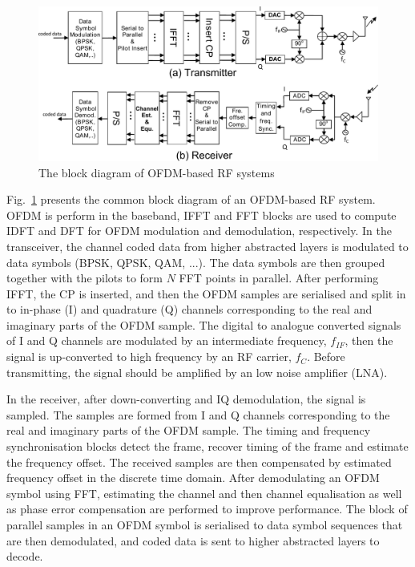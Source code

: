 \begin{figure}
	\centerline{\includegraphics [width=0.8\columnwidth] {Figures/OFDM-block.pdf} }
	\caption{The block diagram of OFDM-based RF systems}
	\label{fig:OFDM-block}
\end{figure}

Fig.~\ref{fig:OFDM-block} presents the common block diagram of an OFDM-based RF system.
OFDM is perform in the baseband, IFFT and FFT blocks are used to compute IDFT and DFT for OFDM modulation and demodulation, respectively.
In the transceiver, the channel coded data from higher abstracted layers is modulated to data symbols (BPSK, QPSK, QAM, ...). The data symbols are then grouped together with the pilots to form $N$ FFT points in parallel.
After performing IFFT, the CP is inserted, and then the OFDM samples are serialised and split in to in-phase (I) and quadrature (Q) channels corresponding to the real and imaginary parts of  the OFDM sample. 
The digital to analogue converted signals of I and Q channels are modulated by an intermediate frequency, $f_{IF}$, then the signal is up-converted to high frequency by an RF carrier, $f_{C}$. 
Before transmitting, the signal should be amplified by an low noise amplifier (LNA).

In the receiver, after down-converting and IQ demodulation, the signal is sampled. The samples are formed from I and Q channels corresponding to the real and imaginary parts of the OFDM sample.
The timing and frequency synchronisation blocks detect the frame, recover timing of the frame and estimate the frequency offset. 
The received samples are then compensated by estimated frequency offset in the discrete time domain. 
After demodulating an OFDM symbol using FFT, estimating the channel and then channel equalisation as well as phase error compensation are performed to improve performance.
The block of parallel samples in an OFDM symbol is serialised to data symbol sequences that are then demodulated, and coded data is sent to higher abstracted layers to decode.

